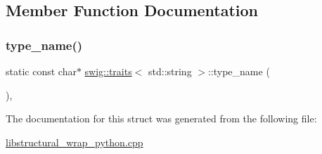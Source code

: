 \subsection{Member Function Documentation}
\mbox{\label{structswig_1_1traits_3_01std_1_1string_01_4_ab4142e71b21ccbad9a8161a116f660d2}} 
\subsubsection{\texorpdfstring{type\+\_\+name()}{type\_name()}}
{\footnotesize\ttfamily static const char$\ast$ \hyperlink{structswig_1_1traits}{swig\+::traits}$<$ std\+::string $>$\+::type\+\_\+name (\begin{DoxyParamCaption}{ }\end{DoxyParamCaption})\hspace{0.3cm}{\ttfamily [inline]}, {\ttfamily [static]}}



The documentation for this struct was generated from the following file\+:\begin{DoxyCompactItemize}
\item 
\hyperlink{libstructural__wrap__python_8cpp}{libstructural\+\_\+wrap\+\_\+python.\+cpp}\end{DoxyCompactItemize}
